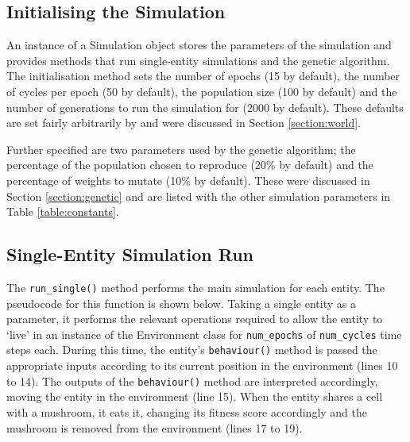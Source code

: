 \documentclass[12pt,a4paper,twoside,openright]{report}
\begin{document}
\subsection{Initialising the Simulation}\label{section:simulation-initialise}

An instance of a Simulation object stores the parameters of the simulation and provides methods that run single-entity simulations and the genetic algorithm. The initialisation method sets the number of epochs (15 by default), the number of cycles per epoch (50 by default), the population size (100 by default) and the number of generations to run the simulation for (2000 by default). These defaults are set fairly arbitrarily by \citet{Cangelosi1998} and were discussed in Section \ref{section:world}.

Further specified are two parameters used by the genetic algorithm; the percentage of the population chosen to reproduce (20\% by default) and the percentage of weights to mutate (10\% by default). These were discussed in Section \ref{section:genetic} and are listed with the other simulation parameters in Table \ref{table:constants}.

\subsection{Single-Entity Simulation Run}\label{section:single-implementation}

The \texttt{run\_single()} method performs the main simulation for each entity. The pseudocode for this function is shown below. Taking a single entity as a parameter, it performs the relevant operations required to allow the entity to `live' in an instance of the Environment class for \texttt{num\_epochs} of \texttt{num\_cycles} time steps each. During this time, the entity's \texttt{behaviour()} method is passed the appropriate inputs according to its current position in the environment (lines 10 to 14). The outputs of the \texttt{behaviour()} method are interpreted accordingly, moving the entity in the environment (line 15). When the entity shares a cell with a mushroom, it eats it, changing its fitness score accordingly and the mushroom is removed from the environment (lines 17 to 19).
\end{document}
